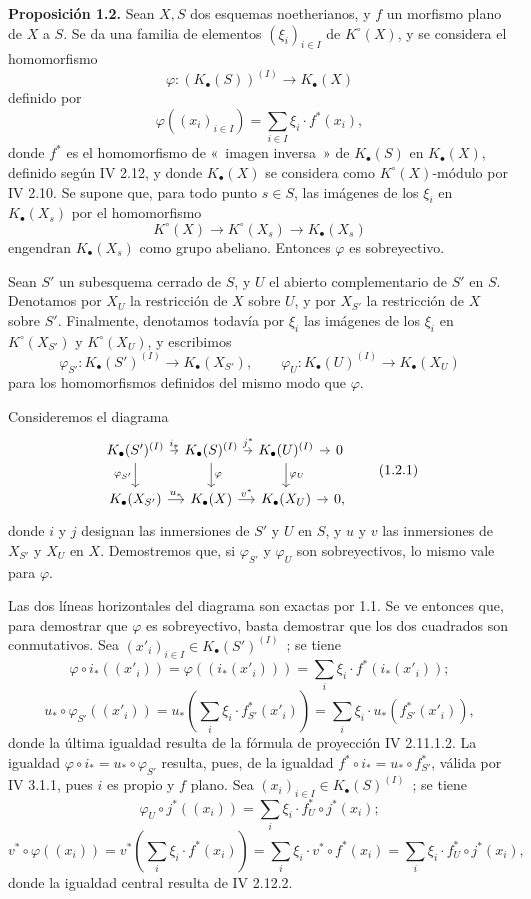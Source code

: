 \textbf{Proposición 1.2.} Sean $X,S$ dos esquemas noetherianos, y $f$ un morfismo plano de $X$ a $S$. Se da una familia de elementos $(\xi_i)_{i\in I}$ de $K^\circ(X)$, y se considera el homomorfismo
\[
\varphi:(K_\bullet(S))^{(I)}\longrightarrow K_\bullet(X)
\]
definido por
\[
\varphi((x_i)_{i\in I})=\sum_{i\in I}\xi_i\cdot f^*(x_i),
\]
donde $f^*$ es el homomorfismo de «~imagen inversa~» de $K_\bullet(S)$ en $K_\bullet(X)$, definido según IV 2.12, y donde $K_\bullet(X)$ se considera como $K^\circ(X)$-módulo por IV 2.10. Se supone que, para todo punto $s\in S$, las imágenes de los $\xi_i$ en $K_\bullet(X_s)$ por el homomorfismo
\[
K^\circ(X)\longrightarrow K^\circ(X_s)\longrightarrow K_\bullet(X_s)
\]
engendran $K_\bullet(X_s)$ como grupo abeliano. Entonces $\varphi$ es sobreyectivo.

Sean $S'$ un subesquema cerrado de $S$, y $U$ el abierto complementario de $S'$ en $S$. Denotamos por $X_U$ la restricción de $X$ sobre $U$, y por $X_{S'}$ la restricción de $X$ sobre $S'$. Finalmente, denotamos todavía por $\xi_i$ las imágenes de los $\xi_i$ en $K^\circ(X_{S'})$ y $K^\circ(X_U)$, y escribimos
\[
\varphi_{S'}:K_\bullet(S')^{(I)}\to K_\bullet(X_{S'}),\qquad
\varphi_U:K_\bullet(U)^{(I)}\to K_\bullet(X_U)
\]
para los homomorfismos definidos del mismo modo que $\varphi$.

Consideremos el diagrama
\[
\begin{tikzcd}[column sep=tiny]
K_\bullet(S')^{(I)} \arrow[r,"i_*"] \arrow[d,"\varphi_{S'}"'] & K_\bullet(S)^{(I)} \arrow[r,"j^*"] \arrow[d,"\varphi"] & K_\bullet(U)^{(I)} \arrow[r] \arrow[d,"\varphi_U"] & 0\\
K_\bullet(X_{S'}) \arrow[r,"u_*"] & K_\bullet(X) \arrow[r,"v^*"] & K_\bullet(X_U) \arrow[r] & 0,
\end{tikzcd}\tag{1.2.1}
\]
donde $i$ y $j$ designan las inmersiones de $S'$ y $U$ en $S$, y $u$ y $v$ las inmersiones de $X_{S'}$ y $X_U$ en $X$. Demostremos que, si $\varphi_{S'}$ y $\varphi_U$ son sobreyectivos, lo mismo vale para $\varphi$.

Las dos líneas horizontales del diagrama son exactas por 1.1. Se ve entonces que, para demostrar que $\varphi$ es sobreyectivo, basta demostrar que los dos cuadrados son conmutativos. Sea $(x'_i)_{i\in I}\in K_\bullet(S')^{(I)}$~; se tiene
\[
\varphi\circ i_*((x'_i))=\varphi((i_*(x'_i)))=\sum_i \xi_i\cdot f^*(i_*(x'_i));
\]
\[
u_*\circ\varphi_{S'}((x'_i))=u_*\left(\sum_i \xi_i\cdot f^*_{S'}(x'_i)\right)=\sum_i \xi_i\cdot u_*(f^*_{S'}(x'_i)),
\]
donde la última igualdad resulta de la fórmula de proyección IV 2.11.1.2. La igualdad $\varphi\circ i_*=u_*\circ\varphi_{S'}$ resulta, pues, de la igualdad $f^*\circ i_*=u_*\circ f^*_{S'}$, válida por IV 3.1.1, pues $i$ es propio y $f$ plano. Sea $(x_i)_{i\in I}\in K_\bullet(S)^{(I)}$~; se tiene
\[
\varphi_U\circ j^*((x_i))=\sum_i \xi_i\cdot f_U^*\circ j^*(x_i);
\]
\[
v^*\circ\varphi((x_i))=v^*\left(\sum_i \xi_i\cdot f^*(x_i)\right)=\sum_i \xi_i\cdot v^*\circ f^*(x_i)=\sum_i \xi_i\cdot f_U^*\circ j^*(x_i),
\]
donde la igualdad central resulta de IV 2.12.2.

